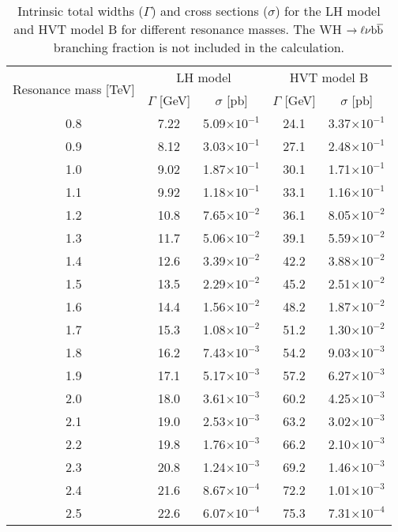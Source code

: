 \begin{table}[!htb]
\caption{
Intrinsic total widths ($\Gamma$) and cross sections ($\sigma$) for the LH model and HVT model B for different resonance masses.
The WH $\rightarrow\ell\nu{\mathrm{b}\overline{\mathrm{b}}}$ branching fraction is not included in the calculation.
}
\label{tab:gamma_xsec_LH_HVT}
\begin{center}
\small
\begin{tabular}{ccccc}
\multirow{2}{*}{{Resonance mass [TeV]}} & \multicolumn{2}{c}{{LH model}} & \multicolumn{2}{c}{{HVT model B}} \\
                 & $\Gamma$ [GeV] & $\sigma$ [pb] & $\Gamma$ [GeV] & $\sigma$ [pb] \\
\hline \hline
0.8 & 7.22 & 5.09$\times 10^{-1}$ & 24.1 & 3.37$\times 10^{-1}$ \\
0.9 & 8.12 & 3.03$\times 10^{-1}$ & 27.1 & 2.48$\times 10^{-1}$ \\
1.0 & 9.02 & 1.87$\times 10^{-1}$ & 30.1 & 1.71$\times 10^{-1}$ \\
1.1 & 9.92 & 1.18$\times 10^{-1}$ & 33.1 & 1.16$\times 10^{-1}$ \\
1.2 & 10.8 & 7.65$\times 10^{-2}$ & 36.1 & 8.05$\times 10^{-2}$ \\
1.3 & 11.7 & 5.06$\times 10^{-2}$ & 39.1 & 5.59$\times 10^{-2}$ \\
1.4 & 12.6 & 3.39$\times 10^{-2}$ & 42.2 & 3.88$\times 10^{-2}$ \\
1.5 & 13.5 & 2.29$\times 10^{-2}$ & 45.2 & 2.51$\times 10^{-2}$ \\
1.6 & 14.4 & 1.56$\times 10^{-2}$ & 48.2 & 1.87$\times 10^{-2}$ \\
1.7 & 15.3 & 1.08$\times 10^{-2}$ & 51.2 & 1.30$\times 10^{-2}$ \\
1.8 & 16.2 & 7.43$\times 10^{-3}$ & 54.2 & 9.03$\times 10^{-3}$ \\
1.9 & 17.1 & 5.17$\times 10^{-3}$ & 57.2 & 6.27$\times 10^{-3}$ \\
2.0 & 18.0 & 3.61$\times 10^{-3}$ & 60.2 & 4.25$\times 10^{-3}$ \\
2.1 & 19.0 & 2.53$\times 10^{-3}$ & 63.2 & 3.02$\times 10^{-3}$ \\
2.2 & 19.8 & 1.76$\times 10^{-3}$ & 66.2 & 2.10$\times 10^{-3}$ \\
2.3 & 20.8 & 1.24$\times 10^{-3}$ & 69.2 & 1.46$\times 10^{-3}$ \\
2.4 & 21.6 & 8.67$\times 10^{-4}$ & 72.2 & 1.01$\times 10^{-3}$ \\
2.5 & 22.6 & 6.07$\times 10^{-4}$ & 75.3 & 7.31$\times 10^{-4}$ \\
\hline
\end{tabular}
\end{center}
\end{table}

